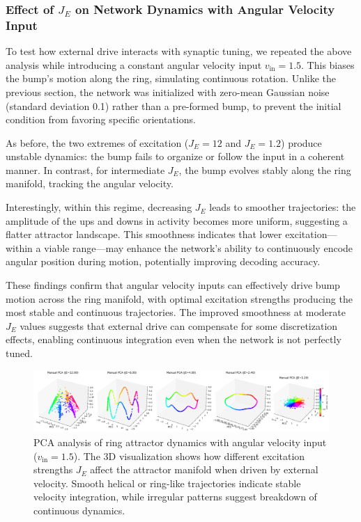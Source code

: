 \documentclass[11pt,a4paper]{article}
\begin{document}
\subsubsection*{Effect of \( J_E \) on Network Dynamics with Angular Velocity Input}

To test how external drive interacts with synaptic tuning, we repeated the above analysis while introducing a constant angular velocity input \( v_{\text{in}} = 1.5 \). This biases the bump’s motion along the ring, simulating continuous rotation. Unlike the previous section, the network was initialized with zero-mean Gaussian noise (standard deviation 0.1) rather than a pre-formed bump, to prevent the initial condition from favoring specific orientations.

As before, the two extremes of excitation (\( J_E = 12 \) and \( J_E = 1.2 \)) produce unstable dynamics: the bump fails to organize or follow the input in a coherent manner. In contrast, for intermediate \( J_E \), the bump evolves stably along the ring manifold, tracking the angular velocity.

Interestingly, within this regime, decreasing \( J_E \) leads to smoother trajectories: the amplitude of the ups and downs in activity becomes more uniform, suggesting a flatter attractor landscape. This smoothness indicates that lower excitation—within a viable range—may enhance the network’s ability to continuously encode angular position during motion, potentially improving decoding accuracy.

These findings confirm that angular velocity inputs can effectively drive bump motion across the ring manifold, with optimal excitation strengths producing the most stable and continuous trajectories. The improved smoothness at moderate \( J_E \) values suggests that external drive can compensate for some discretization effects, enabling continuous integration even when the network is not perfectly tuned.

\begin{figure}[H]
\centering
\includegraphics[width=1.0\textwidth]{manual_pca_with_v.png}
\caption{PCA analysis of ring attractor dynamics with angular velocity input (\( v_{\text{in}} = 1.5 \)). The 3D visualization shows how different excitation strengths \( J_E \) affect the attractor manifold when driven by external velocity. Smooth helical or ring-like trajectories indicate stable velocity integration, while irregular patterns suggest breakdown of continuous dynamics.}
\label{fig:pca_with_velocity}
\end{figure}
\end{document}
